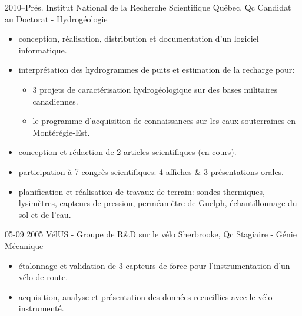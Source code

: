 \documentclass[print]{friggos-cv} %
\begin{document}
\begin{entrylist}
  \entryBul
    {2010--Prés.}
    {Institut National de la Recherche Scientifique}
    {Québec, Qc}
    {Candidat au Doctorat - Hydrogéologie}
    {
     \begin{itemize}[leftmargin=*]
       \setlength\itemsep{0pt}
       \item conception, réalisation, distribution et documentation d'un logiciel informatique.                      
       \item interprétation des hydrogrammes de puits et estimation de la recharge pour:
         \begin{itemize}[leftmargin=0.5cm]
           \item 3 projets de caractérisation hydrogéologique sur des bases militaires canadiennes.
           \item le programme d’acquisition de connaissances sur les eaux souterraines en Montérégie-Est.
         \end{itemize}
       \item conception et rédaction de 2 articles scientifiques (en cours).
       \item participation à 7 congrès scientifiques: 4 affiches \& 3 présentations orales.
       \item planification et réalisation de travaux de terrain: sondes thermiques, lysimètres, capteurs de pression, perméamètre de Guelph, échantillonnage du sol et de l'eau.
     \end{itemize}
     }
\end{entrylist}
\begin{entrylist}
  \entryBul
    {05-09 2005}
    {VélUS - Groupe de R\&D sur le vélo}
    {Sherbrooke, Qc}
    {Stagiaire - Génie Mécanique}
    {
     \begin{itemize}[leftmargin=*]
       \setlength\itemsep{0pt}
       \item étalonnage et validation de 3 capteurs de force pour l'instrumentation d'un vélo de route.
       \item acquisition, analyse et présentation des données recueillies avec le vélo instrumenté.
     \end{itemize}
     }
\end{entrylist}
\end{document}
